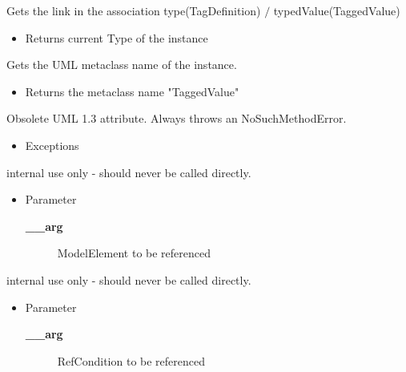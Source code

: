 \begin{desc}Gets the link in the association type(TagDefinition)
 $/$ typedValue(TaggedValue)
\begin{itemize}
\item{Returns current Type of the instance }
\end{itemize}
\end{desc}

\begin{desc}Gets the UML metaclass name of the instance.
\begin{itemize}
\item{Returns the metaclass name "TaggedValue" }
\end{itemize}
\end{desc}

\begin{desc}Obsolete UML 1.3 attribute. Always throws an NoSuchMethodError.
\begin{itemize}
\item{{Exceptions}
}
\end{itemize}
\end{desc}

\begin{desc}internal use only - should never be called directly.
\begin{itemize}
\item{Parameter
  \begin{description}
   \item[{\bf \_\_arg}]{ModelElement to be referenced}
  \end{description}}
\end{itemize}
\end{desc}

\begin{desc}internal use only - should never be called directly.
\begin{itemize}
\item{Parameter
  \begin{description}
   \item[{\bf \_\_arg}]{RefCondition to be referenced}
  \end{description}}
\end{itemize}
\end{desc}

